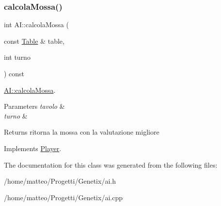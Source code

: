 \subsubsection{\texorpdfstring{calcola\+Mossa()}{calcolaMossa()}}
{\footnotesize\ttfamily int A\+I\+::calcola\+Mossa (\begin{DoxyParamCaption}\item[{const \hyperlink{classTable}{Table} \&}]{table,  }\item[{int}]{turno }\end{DoxyParamCaption}) const\hspace{0.3cm}{\ttfamily [virtual]}}



\hyperlink{classAI_a5ddd05acc3177d4e7a756f7cfc2c3f64}{A\+I\+::calcola\+Mossa}. 


\begin{DoxyParams}{Parameters}
{\em tavolo} & \\
\hline
{\em turno} & \\
\hline
\end{DoxyParams}
\begin{DoxyReturn}{Returns}
ritorna la mossa con la valutazione migliore 
\end{DoxyReturn}


Implements \hyperlink{classPlayer}{Player}.



The documentation for this class was generated from the following files\+:\begin{DoxyCompactItemize}
\item 
/home/matteo/\+Progetti/\+Genetix/ai.\+h\item 
/home/matteo/\+Progetti/\+Genetix/ai.\+cpp\end{DoxyCompactItemize}
